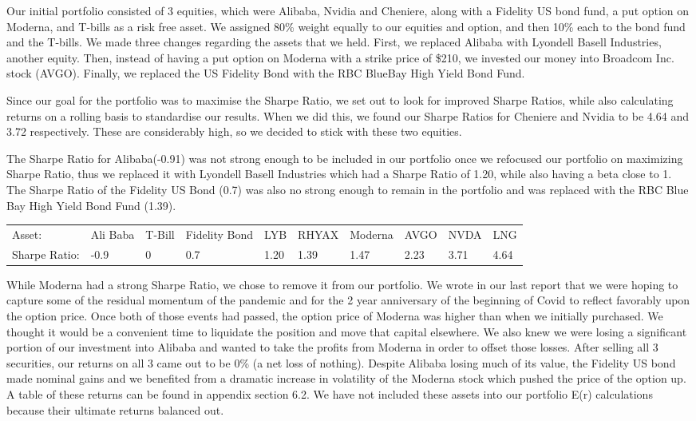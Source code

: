 \documentclass{article}
\begin{document}
Our initial portfolio consisted of 3 equities, which were Alibaba, Nvidia and Cheniere, along with a Fidelity US bond fund, a put option on Moderna, and T-bills as a risk free asset. We assigned 80\% weight equally to our equities and option, and then 10\% each to the bond fund and the T-bills. We made three changes regarding the assets that we held. First, we replaced Alibaba with Lyondell Basell Industries, another equity. Then, instead of having a put option on Moderna with a strike price of \$210, we invested our money into Broadcom Inc. stock (AVGO). Finally, we replaced the US Fidelity Bond with the RBC BlueBay High Yield Bond Fund. 

Since our goal for the portfolio was to maximise the Sharpe Ratio, we set out to look for improved Sharpe Ratios, while also calculating returns on a rolling basis to standardise our results. When we did this, we found our Sharpe Ratios for Cheniere and Nvidia to be 4.64 and 3.72 respectively. These are considerably high, so we decided to stick with these two equities.

The Sharpe Ratio for Alibaba(-0.91) was not strong enough to be included in our portfolio once we refocused our portfolio on maximizing Sharpe Ratio, thus we replaced it with Lyondell Basell Industries which had a Sharpe Ratio of 1.20, while also having a beta close to 1. The Sharpe Ratio of the Fidelity US Bond (0.7) was also no strong enough to remain in the portfolio and was replaced with the RBC Blue Bay High Yield Bond Fund (1.39).

\begin{table}[H]
\centering
\begin{tabular}{llllllllll}
Asset:        & Ali Baba & T-Bill & Fidelity Bond & LYB  & RHYAX & Moderna & AVGO & NVDA & LNG  \\
Sharpe Ratio: & -0.9     & 0      & 0.7           & 1.20 & 1.39  & 1.47    & 2.23 & 3.71 & 4.64
\end{tabular}
\end{table}

While Moderna had a strong Sharpe Ratio, we chose to remove it from our portfolio. We wrote in our last report that we were hoping to capture some of the residual momentum of the pandemic and for the 2 year anniversary of the beginning of Covid to reflect favorably upon the option price. Once both of those events had passed, the option price of Moderna was higher than when we initially purchased. We thought it would be a convenient time to liquidate the position and move that capital elsewhere. We also knew we were losing a significant portion of our investment into Alibaba and wanted to take the profits from Moderna in order to offset those losses. After selling all 3 securities, our returns on all 3 came out to be 0\% (a net loss of nothing). Despite Alibaba losing much of its value, the Fidelity US bond made nominal gains and we benefited from a dramatic increase in volatility of the Moderna stock which pushed the price of the option up. A table of these returns can be found in appendix section 6.2. We have not included these assets into our portfolio E(r) calculations because their ultimate returns balanced out. 
\end{document}
